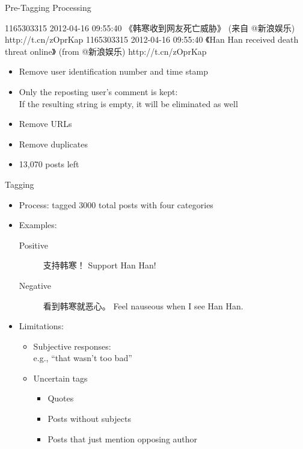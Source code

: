 \documentclass[12pt, trans]{beamer}
\newcommand{\1}[1]{{\mathbf 1}\left\{#1\right\}}        %
\begin{document}
\begin{frame}[fragile]{Pre-Tagging Processing}

\begin{block}{}
1165303315 2012-04-16 09:55:40  《韩寒收到网友死亡威胁》 (来自 @新浪娱乐) http://t.cn/zOprKap
1165303315 2012-04-16 09:55:40  《Han Han received death threat online》 (from @新浪娱乐) http://t.cn/zOprKap
\end{block}


\begin{itemize}[<+->]
\item Remove user identification number and time stamp
\item Only the reposting user's comment is kept:\\
If the resulting string is empty, it will be eliminated as well
\item Remove URLs 
\item Remove duplicates 
\item 13,070 posts left
\end{itemize}


\end{frame}


\begin{frame}{Tagging}

\begin{itemize}[<+->]
\item  Process: tagged 3000 total posts with four categories
\item Examples:
	\begin{description}
	\item[Positive] 支持韩寒！ Support Han Han!
	\item[Negative] 看到韩寒就恶心。 Feel nauseous when I see Han Han.
	\end{description}


\item Limitations:
	
	\begin{itemize}
	\item Subjective responses:\\
		\quad e.g., ``that wasn't too bad''
	\item 	Uncertain tags
		\begin{itemize}
		\item Quotes
		\item Posts without subjects
		\item Posts that just mention opposing author
		\end{itemize}
	\end{itemize}

\end{itemize}

\end{frame}
\end{document}
